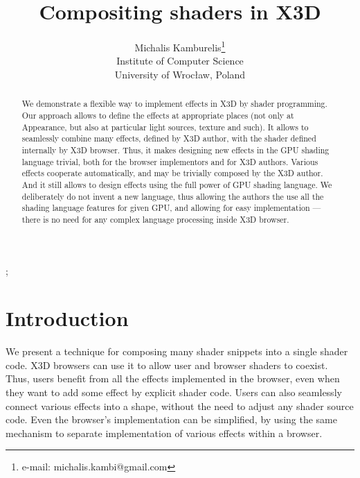 \documentclass{acmsiggraph}                     %
\title{Compositing shaders in X3D}
\author{Michalis Kamburelis\thanks{e-mail: michalis.kambi@gmail.com}\\Institute of Computer Science\\University of Wroc{\l}aw, Poland}
\begin{document}
\maketitle

\begin{abstract}
We demonstrate a flexible way to implement effects in X3D by shader programming.
Our approach allows to define the effects at appropriate places
(not only at Appearance, but also at particular light sources, texture and such).
It allows to seamlessly combine many effects, defined by X3D author,
with the shader defined internally by X3D browser.
Thus, it makes designing new effects in the GPU shading language trivial,
both for the browser implementors and for X3D authors. Various effects
cooperate automatically, and may be trivially composed by the X3D author.
And it still allows to design effects using the full power of GPU shading
language. We deliberately do not invent a new language, thus allowing
the authors the use all the shading language features for given GPU,
and allowing for easy implementation --- there is no need for any complex
language processing inside X3D browser.
\end{abstract}

\begin{CRcatlist}
  ;
\end{CRcatlist}

\keywordlist


\section{Introduction}

\copyrightspace

We present a technique for composing many shader snippets into a
single shader code. X3D browsers can use it to allow user and browser
shaders to coexist. Thus, users benefit from all the effects
implemented in the browser, even when they want to add some effect by
explicit shader code. Users can also seamlessly connect various
effects into a shape, without the need to adjust any shader source
code. Even the browser's implementation can be simplified, by using
the same mechanism to separate implementation of various effects
within a browser.
\end{document}
